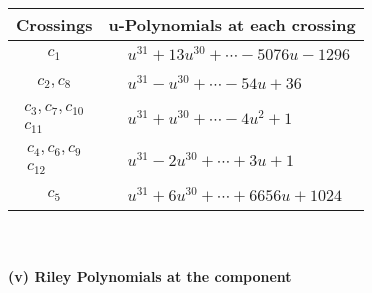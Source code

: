 \documentclass[1p]{elsarticle_modified}
\theoremstyle{definition}
\begin{document}
\begin{tabular}{m{50pt}|m{274pt}}
Crossings & \hspace{64pt}u-Polynomials at each crossing \\
\hline $$\begin{aligned}c_{1}\end{aligned}$$&$\begin{aligned}
&u^{31}+13 u^{30}+\cdots-5076 u-1296
\end{aligned}$\\
\hline $$\begin{aligned}c_{2},c_{8}\end{aligned}$$&$\begin{aligned}
&u^{31}- u^{30}+\cdots-54 u+36
\end{aligned}$\\
\hline $$\begin{aligned}c_{3},c_{7},c_{10}\\c_{11}\end{aligned}$$&$\begin{aligned}
&u^{31}+u^{30}+\cdots-4 u^2+1
\end{aligned}$\\
\hline $$\begin{aligned}c_{4},c_{6},c_{9}\\c_{12}\end{aligned}$$&$\begin{aligned}
&u^{31}-2 u^{30}+\cdots+3 u+1
\end{aligned}$\\
\hline $$\begin{aligned}c_{5}\end{aligned}$$&$\begin{aligned}
&u^{31}+6 u^{30}+\cdots+6656 u+1024
\end{aligned}$\\
\hline
\end{tabular}\\~\\
\newpage\renewcommand{\arraystretch}{1}
\flushleft \textbf{(v) Riley Polynomials at the component}\newline \\
\end{document}
